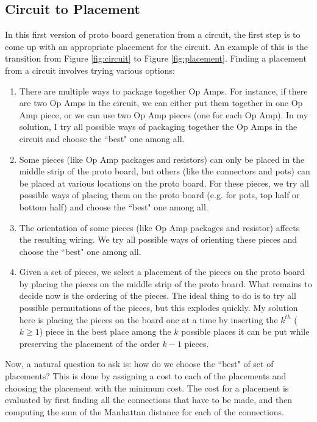 \documentclass[12pt]{amsart}
\begin{document}
\subsection{Circuit to Placement}

In this first version of proto board generation from a circuit, the first step is to come up with an appropriate placement for the circuit. An example of this is the transition from Figure \ref{fig:circuit} to Figure \ref{fig:placement}. Finding a placement from a circuit involves trying various options:

\begin{enumerate}
\item There are multiple ways to package together Op Amps. For instance, if there are two Op Amps in the circuit, we can either put them together in one Op Amp piece, or we can use two Op Amp pieces (one for each Op Amp). In my solution, I try all possible ways of packaging together the Op Amps in the circuit and choose the ``best" one among all.
\item Some pieces (like Op Amp packages and resistors) can only be placed in the middle strip of the proto board, but others (like the connectors and pots) can be placed at various locations on the proto board. For these pieces, we try all possible ways of placing them on the proto board (e.g. for pots, top half or bottom half) and choose the ``best" one among all.
\item The orientation of some pieces (like Op Amp packages and resistor) affects the resulting wiring. We try all possible ways of orienting these pieces and choose the ``best" one among all.
\item Given a set of pieces, we select a placement of the pieces on the proto board by placing the pieces on the middle strip of the proto board. What remains to decide now is the ordering of the pieces. The ideal thing to do is to try all possible permutations of the pieces, but this explodes quickly. My solution here is placing the pieces on the board one at a time by inserting the $k^{th}$ ($k \ge 1$) piece in the best place among the $k$ possible places it can be put while preserving the placement of the order $k - 1$ pieces.
\end{enumerate}

Now, a natural question to ask is: how do we choose the ``best" of  set of placements? This is done by assigning a cost to each of the placements and choosing the placement with the minimum cost. The cost for a placement is evaluated by first finding all the connections that have to be made, and then computing the sum of the Manhattan distance for each of the connections.
\end{document}
